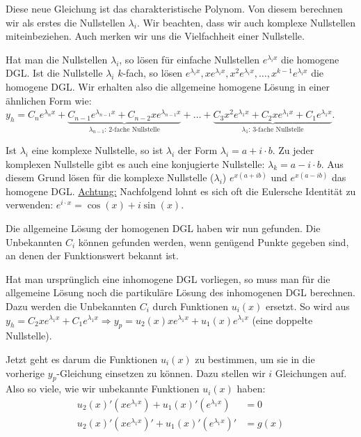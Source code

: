 Diese neue Gleichung ist das charakteristische Polynom. Von diesem berechnen wir
als erstes die Nullstellen $\lambda_i$. Wir beachten, dass wir auch komplexe Nullstellen
miteinbeziehen. Auch merken wir uns die Vielfachheit einer Nullstelle.

Hat man die Nullstellen $\lambda_i$, so lösen für einfache Nullstellen $e^{\lambda_i x}$
die homogene DGL. Ist die Nullstelle $\lambda_i$ $k$-fach, so lösen
$e^{\lambda_i x}, x e^{\lambda_i x}, x^2 e^{\lambda_i x}, \ldots, x^{k-1} e^{\lambda_i x}$
die homogene DGL. Wir erhalten also die allgemeine homogene Lösung in einer ähnlichen Form wie:
$y_h = C_n e^{\lambda_n x} + 
\underbrace{C_{n-1} e^{\lambda_{n-1} x} + C_{n-2} x e^{\lambda_{n-1} x}}_{\lambda_{n-1} \text{: 2-fache Nullstelle}} + \ldots + 
\underbrace{C_3 x^2 e^{\lambda_1 x} + C_2 x e^{\lambda_1 x} + C_1 e^{\lambda_1 x}}_{\lambda_1 \text{: 3-fache Nullstelle}}$.

Ist $\lambda_i$ eine komplexe Nullstelle, so ist $\lambda_i$ der Form $\lambda_i = a + i \cdot b$.
Zu jeder komplexen Nullstelle gibt es auch eine konjugierte Nullstelle: $\lambda_k = a - i \cdot b$.
Aus diesem Grund lösen für die komplexe Nullstelle ($\lambda_i$) $e^{x (a + ib)}$ und
$e^{x (a - ib)}$ das homogene DGL. \underline{Achtung:} Nachfolgend lohnt es sich oft die
Eulersche Identität zu verwenden: $e^{i \cdot x} = \cos(x) + i \sin(x)$.

Die allgemeine Lösung der homogenen DGL haben wir nun gefunden. Die Unbekannten $C_i$
können gefunden werden, wenn genügend Punkte gegeben sind, an denen der Funktionswert bekannt ist.

Hat man ursprünglich eine inhomogene DGL vorliegen, so muss man für die allgemeine Lösung
noch die partikuläre Lösung des inhomogenen DGL berechnen. Dazu werden die Unbekannten
$C_i$ durch Funktionen $u_i(x)$ ersetzt. So wird aus
$y_h = C_2 x e^{\lambda_1 x} + C_1 e^{\lambda_1 x} \Rightarrow
y_p = u_2(x) x e^{\lambda_1 x} + u_1(x) e^{\lambda_1 x}$ (eine doppelte Nullstelle).

Jetzt geht es darum die Funktionen $u_i(x)$ zu bestimmen, um sie in die vorherige
$y_p$-Gleichung einsetzen zu können. Dazu stellen wir $i$ Gleichungen auf.
Also so viele, wie wir unbekannte Funktionen $u_i(x)$ haben:
\begin{align*}
u_2(x)' (x e^{\lambda_1 x}) + u_1(x)' (e^{\lambda_1 x}) &= 0\\
u_2(x)' (x e^{\lambda_1 x})' + u_1(x)' (e^{\lambda_1 x})' &= g(x)
\end{align*}

